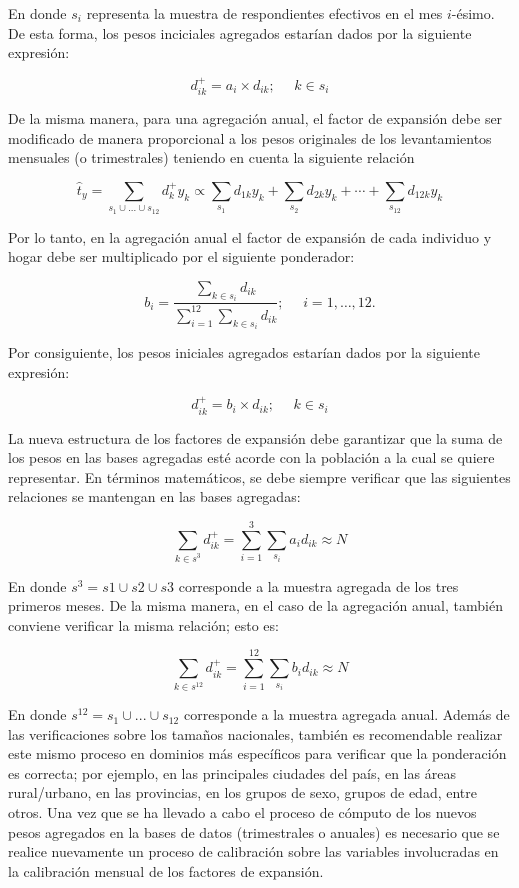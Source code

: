 \documentclass[
  12pt,
]{book}
\begin{document}
En donde \(s_i\) representa la muestra de respondientes efectivos en el mes \(i\)-ésimo. De esta forma, los pesos inciciales agregados estarían dados por la siguiente expresión:

\[
d_{ik}^+ = a_i \times d_{ik} ; \ \ \ \ \ \ k\in s_i
\]

De la misma manera, para una agregación anual, el factor de expansión
debe ser modificado de manera proporcional a los pesos originales de los
levantamientos mensuales (o trimestrales) teniendo en cuenta la
siguiente relación

\[
\hat{t}_y = \sum_{s_1 \cup ... \cup s_{12}} d_{k}^+ y_k
\propto 
\sum_{s_1} d_{1k} y_k + \sum_{s_2} d_{2k} y_k + \cdots + \sum_{s_{12}} d_{12k} y_k
\]

Por lo tanto, en la agregación anual el factor de expansión de cada
individuo y hogar debe ser multiplicado por el siguiente ponderador:

\[
b_i = \frac{\sum_{k\in s_i}d_{ik}}{\sum_{i=1}^{12}\sum_{k\in s_i}d_{ik}} ; \ \ \ \ \ \ i= 1, \ldots, 12.
\]

Por consiguiente, los pesos iniciales agregados estarían dados por la siguiente expresión:

\[
d_{ik}^+ = b_i \times d_{ik} ; \ \ \ \ \ \ k\in s_i
\]

La nueva estructura de los factores de expansión debe garantizar que la
suma de los pesos en las bases agregadas esté acorde con la población a
la cual se quiere representar. En términos matemáticos, se debe siempre
verificar que las siguientes relaciones se mantengan en las bases
agregadas:

\[
\sum_{k\in s^3} d_{ik}^+ = \sum_{i=1}^{3}\sum_{s_i} a_i d_{ik} \approx N
\]

En donde \(s^3=s1 \cup s2 \cup s3\) corresponde a la muestra agregada de los tres primeros meses. De la misma manera, en el caso de la agregación anual, también conviene verificar la misma relación; esto es:

\[
\sum_{k\in s^{12}} d_{ik}^+ = \sum_{i=1}^{12}\sum_{s_i} b_i d_{ik} \approx N
\]

En donde \(s^{12}=s_1 \cup ... \cup s_{12}\) corresponde a la muestra agregada anual. Además de las verificaciones sobre los tamaños nacionales, también es recomendable
realizar este mismo proceso en dominios más específicos para verificar
que la ponderación es correcta; por ejemplo, en las principales ciudades
del país, en las áreas rural/urbano, en las provincias, en los grupos de sexo, grupos de edad, entre otros. Una vez que se ha llevado a cabo el proceso de cómputo de
los nuevos pesos agregados en la bases de datos (trimestrales o
anuales) es necesario que se realice nuevamente un proceso de
calibración sobre las variables involucradas en la calibración mensual de los factores de expansión.
\end{document}
